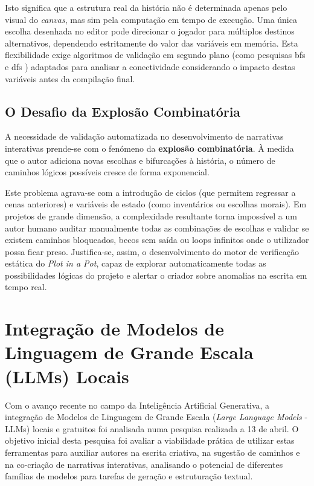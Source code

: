 Isto significa que a estrutura real da história não é determinada apenas pelo visual do \textit{canvas}, mas sim pela computação em tempo de execução. Uma única escolha desenhada no editor pode direcionar o jogador para múltiplos destinos alternativos, dependendo estritamente do valor das variáveis em memória. Esta flexibilidade exige algoritmos de validação em segundo plano (como pesquisas \gls{bfs} e \gls{dfs} \citep{CLRS2009}) adaptados para analisar a conectividade considerando o impacto destas variáveis antes da compilação final.

\subsection{O Desafio da Explosão Combinatória}
\label{subsec:desafio-explosao-combinatoria}
A necessidade de validação automatizada no desenvolvimento de narrativas interativas prende-se com o fenómeno da \textbf{explosão combinatória}. À medida que o autor adiciona novas escolhas e bifurcações à história, o número de caminhos lógicos possíveis cresce de forma exponencial.

Este problema agrava-se com a introdução de ciclos (que permitem regressar a cenas anteriores) e variáveis de estado (como inventários ou escolhas morais). Em projetos de grande dimensão, a complexidade resultante torna impossível a um autor humano auditar manualmente todas as combinações de escolhas e validar se existem caminhos bloqueados, becos sem saída ou loops infinitos onde o utilizador possa ficar preso. Justifica-se, assim, o desenvolvimento do motor de verificação estática do \textit{Plot in a Pot}, capaz de explorar automaticamente todas as possibilidades lógicas do projeto e alertar o criador sobre anomalias na escrita em tempo real.

\section{Integração de Modelos de Linguagem de Grande Escala (LLMs) Locais}
\label{sec:integracao-llms}
Com o avanço recente no campo da Inteligência Artificial Generativa, a integração de Modelos de Linguagem de Grande Escala (\textit{Large Language Models} - LLMs) locais e gratuitos foi analisada numa pesquisa realizada a 13 de abril. O objetivo inicial desta pesquisa foi avaliar a viabilidade prática de utilizar estas ferramentas para auxiliar autores na escrita criativa, na sugestão de caminhos e na co-criação de narrativas interativas, analisando o potencial de diferentes famílias de modelos para tarefas de geração e estruturação textual.

